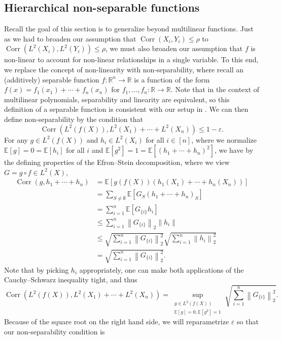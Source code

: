 \documentclass[12pt,letterpaper]{amsart}
\def\E{\mathbb{E}}
\def\R{\mathbb{R}}
\def\Corr{\operatorname{Corr}}
\newcommand{\norm}[1]{\left\lVert#1\right\rVert}
\newcommand{\1}[1]{1_{\left\{#1\right\}}}
\theoremstyle{definition}
\theoremstyle{remark}
\begin{document}
\subsection{Hierarchical non-separable functions}\label{subsec:hierarchical_nonseparable}
Recall the goal of this section is to generalize  beyond multilinear functions.
Just as we had to broaden our assumption that $\Corr(X_i,Y_i)\leq\rho$ to $\Corr(L^2(X_i),L^2(Y_i))\leq\rho$, we must also broaden our assumption that $f$ is non-linear to account for non-linear relationships in a single variable.
To this end, we replace the concept of non-linearity with non-separability, where recall an (additively) separable function $f:\R^n\to\R$ is a function of the form $f(x)=f_1(x_1)+\cdots+f_n(x_n)$ for $f_1,\dots,f_n:\R\to\R$.
Note that in the context of multilinear polynomials, separability and linearity are equivalent, so this definition of a separable function is consistent with our setup in .
We can then define non-separability by the condition that
\[ \Corr(L^2(f(X)),L^2(X_1)+\cdots+L^2(X_n))\leq 1-\varepsilon. \]
For any $g\in L^2(f(X))$ and $h_i\in L^2(X_i)$ for all $i\in[n]$, where we normalize $\E[g]=0=\E[h_i]$ for all $i$ and $\E[g^2]=1=\E[(h_1+\cdots+h_n)^2]$, we have by the defining properties of the Efron--Stein decomposition, where we view $G=g\circ f\in L^2(X)$,
\begin{align*}
    \Corr(g,h_1+\cdots+h_n)
    &= \E[g(f(X))(h_1(X_1)+\cdots+h_n(X_n))]
    \\ &= \sum_{S\neq\emptyset}\E[G_S(h_1+\cdots+h_n)_S]
    \\ &= \sum_{i=1}^n\E[G_{\{i\}} h_i]
    \\ &\leq \sum_{i=1}^n\norm{G_{\{i\}}}_2\norm{h_i}
    \\ &\leq \sqrt{\sum_{i=1}^n\norm{G_{\{i\}}}_2^2}\sqrt{\sum_{i=1}^n\norm{h_i}_2^2}
    \\ &= \sqrt{\sum_{i=1}^n\norm{G_{\{i\}}}_2^2}.
\end{align*}
Note that by picking $h_i$ appropriately, one can make both applications of the Cauchy--Schwarz inequality tight, and thus
\begin{equation}\label{eq:epsilon_equivalence_1}
    \Corr(L^2(f(X)),L^2(X_1)+\cdots+L^2(X_n)) = \sup_{\substack{g\in L^2(f(X))\\\E[g]=0,\E[g^2]=1}}\sqrt{\sum_{i=1}^n\norm{G_{\{i\}}}_2^2}.
\end{equation}
Because of the square root on the right hand side, we will reparametrize $\varepsilon$ so that our non-separability condition is
\end{document}
